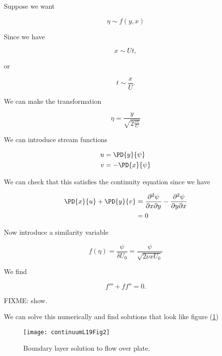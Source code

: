 Suppose we want

\begin{equation}\label{eqn:continuumL19:n}
\eta \sim f(y, x)
\end{equation}

Since we have

\begin{equation}\label{eqn:continuumL19:n}
x \sim U t,
\end{equation}

or

\begin{equation}\label{eqn:continuumL19:n}
t \sim \frac{x}{U}.
\end{equation}

We can make the transformation

\begin{equation}\label{eqn:continuumL19:n}
\eta = \frac{y}{\sqrt{2 \frac{\nu x}{U}}}
\end{equation}

We can introduce stream functions

\begin{align}\label{eqn:continuumProblemSet2:n}
u &= \PD{y}{\psi} \\
v &= -\PD{x}{\psi}
\end{align}

We can check that this satisfies the continuity equation since we have

\begin{align*}
\PD{x}{u} + \PD{y}{v} 
&=
\frac{\partial^2 \psi}{\partial x \partial y}
-\frac{\partial^2 \psi}{\partial y \partial x} \\
&= 0
\end{align*}

Now introduce a similarity variable 

\begin{equation}\label{eqn:continuumL19:n}
f(\eta) = \frac{\psi}{\delta U_0} = \frac{\psi}{\sqrt{2 \nu x U_0}}
\end{equation}

We find

\begin{equation}\label{eqn:continuumL19:n}
f''' + f f'' = 0.
\end{equation}

FIXME: show.

We can solve this numerically and find solutions that look like figure (\ref{fig:continuumL19:continuumL19Fig2})
\begin{figure}[htp]
   \centering
   \texttt{[image: continuumL19Fig2]}
   \caption{Boundary layer solution to flow over plate.}\label{fig:continuumL19:continuumL19Fig2}
\end{figure}

